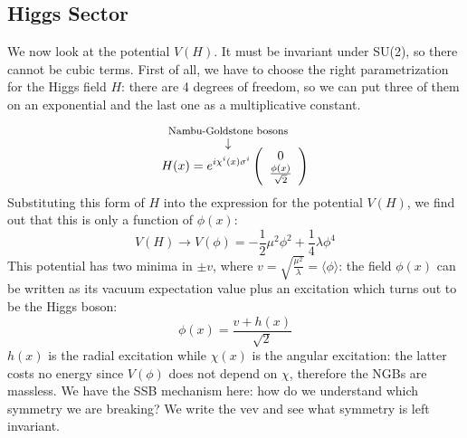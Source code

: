 \documentclass[../main.tex]{subfiles}
\begin{document}
\subsection{Higgs Sector}
We now look at the potential $V(H)$. It must be invariant under SU(2), so there cannot be cubic terms.  First of all, we have to choose the right parametrization for the Higgs field $H$: there are 4 degrees of freedom, so we can put three of them on an exponential and the last one as a multiplicative constant.
\[
H(x)=e^{i\overset{\mathclap{\tikz \node {$\downarrow$} node [above=1ex] {\footnotesize  Nambu-Goldstone bosons};}}{\chi^i(x)}\sigma^i}\left(\begin{array}{c}0\\\frac{\phi(x)}{\sqrt{2}}\end{array}\right)
\]
Substituting this form of $H$ into the expression for the potential $V(H)$, we find out that this is only a function of $\phi(x)$:
\[
V(H)\xrightarrow[]{}V(\phi)=-\frac{1}{2}\mu^2\phi^2+\frac{1}{4}\lambda\phi^4
\]
This potential has two minima in $\pm v$, where $v=\sqrt{\frac{\mu^2}{\lambda}}=\langle\phi\rangle$: the field $\phi(x)$ can be written as its vacuum expectation value plus an excitation which turns out to be the Higgs boson:
\[
\phi(x)=\frac{v+h(x)}{\sqrt{2}}
\]
$h(x)$ is the radial excitation while $\chi(x)$ is the angular excitation: the latter costs no energy since $V(\phi)$ does not depend on $\chi$, therefore the NGBs are massless. We have the SSB mechanism here: how do we understand which symmetry we are breaking? We write the vev and see what symmetry is left invariant.
\end{document}
